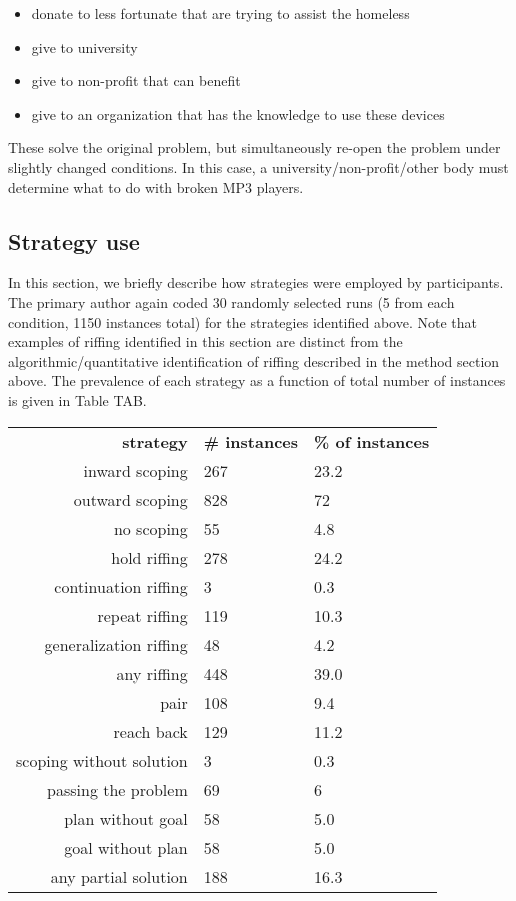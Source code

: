 \begin{itemize}
    \item donate to less fortunate that are trying to assist the homeless
    \item give to university
    \item give to non-profit that can benefit
    \item give to an organization that has the knowledge to use these devices
\end{itemize}

These solve the original problem, but simultaneously re-open the problem under slightly changed conditions. In this case, a university/non-profit/other body must determine what to do with broken MP3 players.

\subsection{Strategy use}

In this section, we briefly describe how strategies were employed by participants. The primary author again coded 30 randomly selected runs (5 from each condition, 1150 instances total) for the strategies identified above. Note that examples of riffing identified in this section are distinct from the algorithmic/quantitative identification of riffing described in the method section above. The prevalence of each strategy as a function of total number of instances is given in Table TAB.

\begin{table}
    \begin{tabular}{r | l l}
        \textbf{strategy} & \textbf{\# instances} & \textbf{\% of instances} \\
        inward scoping & 267 & 23.2 \\
        outward scoping & 828 & 72 \\
        no scoping & 55 & 4.8 \\
        \hline \hline
        hold riffing & 278 & 24.2 \\
        continuation riffing & 3 & 0.3 \\
        repeat riffing & 119 & 10.3 \\
        generalization riffing & 48 & 4.2 \\
        \hline
        any riffing & 448 & 39.0 \\
        pair & 108 & 9.4 \\
        reach back & 129 & 11.2 \\
        \hline \hline
        scoping without solution & 3 & 0.3 \\
        passing the problem & 69 & 6 \\
        plan without goal & 58 & 5.0 \\
        goal without plan & 58 & 5.0 \\ 
        \hline
        any partial solution & 188 & 16.3 \\
    \end{tabular}
\end{table}

